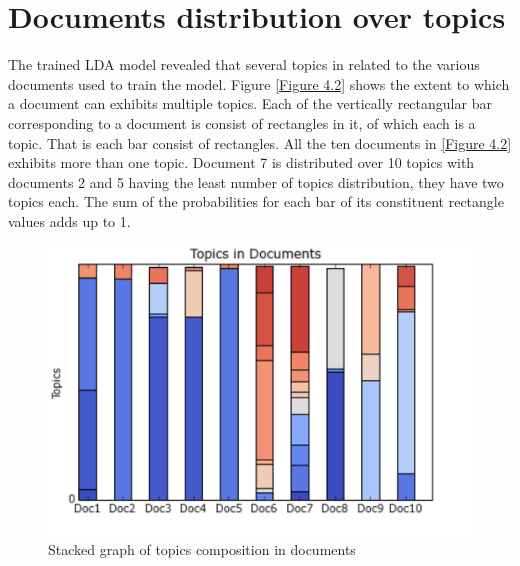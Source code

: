 \section{Documents distribution over topics}
The trained LDA model revealed that several topics in related to the various documents used to train the model. Figure \eqref{Figure 4.2} shows the extent to which a document can exhibits multiple topics. Each of the vertically rectangular bar corresponding to a document is consist of rectangles in it, of which each is a topic. That is each bar consist of rectangles. All the ten documents in \eqref{Figure 4.2} exhibits more than one topic. Document 7 is distributed over 10 topics with documents 2 and 5 having the least number of topics distribution,  they have two topics each. The sum of the probabilities for each bar of its constituent rectangle values adds up to 1.
\begin{figure}[h]
\centering
\includegraphics[scale=0.85]{c4_3.png}
\caption{Stacked graph of topics composition in documents}\label{Figure 4.2}
\end{figure}
